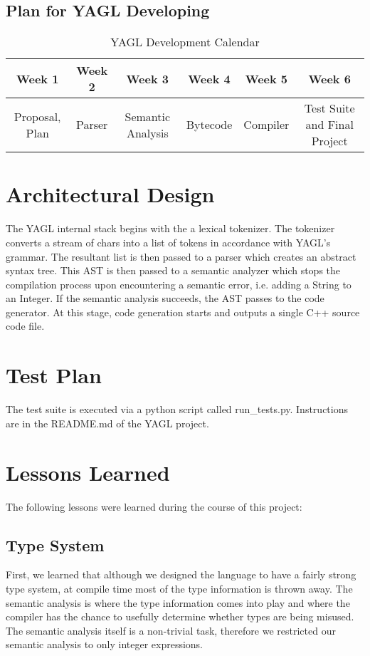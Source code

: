 \documentclass[12pt]{article}
\begin{document}
\subsection{Plan for YAGL Developing }
\begin{table}[H]
\caption{YAGL Development Calendar}
\centering
\begin{tabular}{c c c c c c}

\textbf{Week 1} & \textbf{Week 2} & \textbf{Week 3} & \textbf{Week 4} & \textbf{Week 5} & \textbf{Week 6}\\ [0.5ex] %
\hline
Proposal, Plan&Parser&Semantic Analysis&Bytecode&Compiler&Test Suite and Final Project \\

\hline
\end{tabular}
\end{table}
\section{Architectural Design}
The YAGL internal stack begins with the a lexical tokenizer. The tokenizer converts a stream of chars into a 
list of tokens in accordance with YAGL's grammar. The resultant list is then passed to a parser which creates an 
abstract syntax tree. This AST is then passed to a 
semantic analyzer which stops the compilation process
upon encountering a semantic error, i.e. adding a String to an Integer. If the semantic analysis succeeds, the AST 
passes to the code generator. At this stage, code generation starts and outputs a single C++ source code file. 

\section{Test Plan}
The test suite is executed via a python script called 
run\_tests.py. Instructions are in the README.md of the 
YAGL project. 

\section{Lessons Learned}

The following lessons were learned during the course of this project:

\subsection{Type System}
First, we learned that although we designed the language to have a fairly strong type system, at compile time most of the type information is thrown away.  The semantic analysis is where the type information comes into play and where the compiler has the chance to usefully determine whether types are being misused.  The semantic analysis itself is a non-trivial task, therefore we restricted our semantic analysis to only integer expressions.
\end{document}
